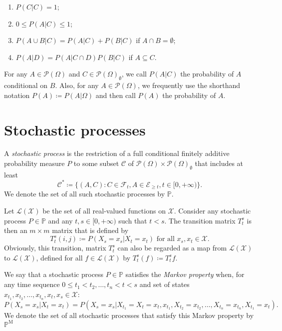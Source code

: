 \documentclass[a4paper,reqno]{amsart}
\newcommand{\states}{\mathcal{X}}
\newcommand{\paths}{\Omega}
\newcommand{\power}{\mathcal{P}(\paths)}
\newcommand{\nonemptypower}{\power_{\emptyset}}
\newcommand{\events}{\mathcal{E}}
\newcommand{\filter}[1][t]{\mathcal{F}_{#1}}
\newcommand{\processes}{\mathbb{P}}
\newcommand{\mprocesses}{\processes^{\mathrm{M}}}
\newcommand{\gambles}{\mathcal{L}}
\newcommand{\gamblesX}{\gambles(\states)}
\begin{document}
\begin{enumerate}[label=F\arabic*:]
\item
$P(C\vert C)=1$;
\item
$0\leq P(A\vert C)\leq 1$;
\item
$P(A\cup B\vert C)=P(A\vert C)+P(B\vert C)$ if $A\cap B=\emptyset$;
\item
$P(A\vert D)=P(A\vert C\cap D)P(B\vert C)$ if $A\subseteq C$.
\end{enumerate}
\vspace{5pt}

\noindent
For any $A\in\power$ and $C\in\nonemptypower$, we call $P(A\vert C)$ the probability of $A$ conditional on $B$. Also, for any $A\in\power$, we frequently use the shorthand notation $P(A)\coloneqq P(A\vert\paths)$ and then call $P(A)$ the probability of $A$.

\section{Stochastic processes}

A \emph{stochastic process} is the restriction of a full conditional finitely additive probability measure $P$ to some subset $\mathcal{C}$ of $\power\times\nonemptypower$ that includes at least
\begin{equation*}
\mathcal{C^*}\coloneqq\big\{
(A,C)
\colon
C\in\filter, A\in\events_{\geq t}, t\in[0,+\infty)
\big\}.
\end{equation*}
We denote the set of all such stochastic processes by $\processes$.

Let $\gamblesX$ be the set of all real-valued functions on $\states$. Consider any stochastic process $P\in\processes$ and any $t,s\in[0,+\infty)$ such that $t<s$. The transition matrix $T_t^s$ is then an $m\times m$ matrix that is defined by
\begin{equation*}
T_t^s(i,j)\coloneqq P(X_s=x_s\vert X_t=x_t)\text{ for all $x_s,x_t\in\states$}.
\end{equation*}
Obviously, this transition, matrix $T_t^s$ can also be regarded as a map from $\gamblesX$ to $\gamblesX$, defined for all $f\in\gamblesX$ by $T_t^s(f)\coloneqq T_t^sf$.

We say that a stochastic process $P\in\processes$ satisfies the \emph{Markov property} when, for any time sequence $0\leq t_1<t_2,\dots,t_{n}<t<s$ and set of states $x_{t_1},x_{t_2},\dots,x_{t_n},x_t,x_s\in\states$:
\begin{equation*}
P(X_s=x_s\vert X_t=x_t)=P(X_s=x_s\vert X_{t_1}=X_t=x_t,x_{t_1},X_{t_2}=x_{t_2}, \dots, X_{t_n}=x_{t_n}, X_{t_1}=x_{t}).
\end{equation*}
We denote the set of all stochastic processes that satisfy this Markov property by $\mprocesses$
\end{document}

